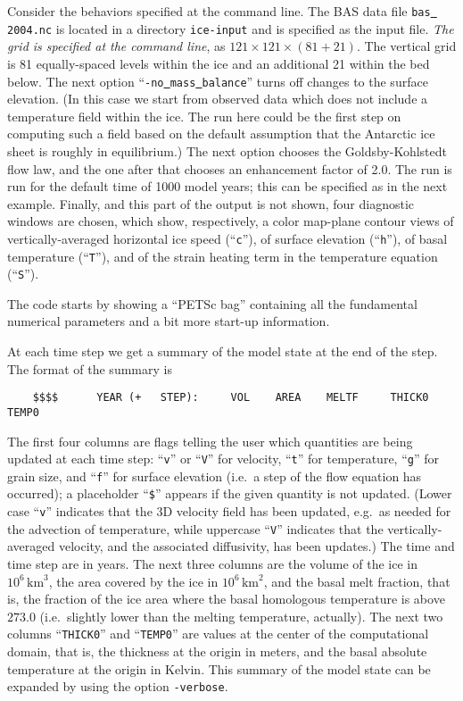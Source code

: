 \documentclass[final]{amsart}
\renewcommand{\t}[1]{\texttt{#1}}
\begin{document}
Consider the behaviors specified at the command line.  The BAS data file \t{bas\underline{ }2004.nc} is located in a directory \t{ice-input} and is specified as the input file.  \emph{The grid is specified at the command line}, as $121\times 121 \times (81+21)$.  The vertical grid is 81 equally-spaced levels within the ice and an additional 21 within the bed below.  The next option ``\t{-no\underline{ }mass\underline{ }balance}'' turns off changes to the surface elevation.  (In this case we start from observed data which does not include a temperature field within the ice.  The run here could be the first step on computing such a field based on the default assumption that the Antarctic ice sheet is roughly in equilibrium.)  The next option chooses the Goldsby-Kohlstedt \cite{GoldsbyKohlstedt} flow law, and the one after that chooses an enhancement factor of 2.0.  The run is run for the default time of 1000 model years; this can be specified as in the next example.  Finally, and this part of the output is not shown, four diagnostic windows are chosen, which show, respectively, a color map-plane contour views of vertically-averaged horizontal ice speed (``\t{c}''), of surface elevation (``\t{h}''), of basal temperature (``\t{T}''), and of the strain heating term in the temperature equation (``\t{S}'').

The code starts by showing a ``PETSc bag'' containing all the fundamental numerical parameters and a bit more start-up information.

At each time step we get a summary of the model state at the end of the step.  The format of the summary is
\scriptsize\begin{verbatim}
    $$$$      YEAR (+   STEP):     VOL    AREA    MELTF     THICK0     TEMP0
\end{verbatim}
\normalsize
The first four columns are flags telling the user which quantities are being updated at each time step: ``\texttt{v}'' or ``\texttt{V}'' for velocity, ``\texttt{t}'' for temperature, ``\texttt{g}'' for grain size, and ``\texttt{f}'' for surface elevation (i.e.~a step of the flow equation has occurred); a placeholder ``\verb|$|'' appears if the given quantity is not updated.  (Lower case ``\texttt{v}'' indicates that the 3D velocity field has been updated, e.g.~as needed for the advection of temperature, while uppercase ``\texttt{V}'' indicates that the vertically-averaged velocity, and the associated diffusivity, has been updates.)  The time and time step are in years.  The next three columns are the volume of the ice in $10^6 \,\text{km}^3$, the area covered by the ice in $10^6\,\text{km}^2$, and the basal melt fraction, that is, the fraction of the ice area where the basal homologous temperature is above $273.0$ (i.e.~slightly lower than the melting temperature, actually).  The next two columns ``\texttt{THICK0}'' and ``\texttt{TEMP0}'' are values at the center of the computational domain, that is, the thickness at the origin in meters, and the basal absolute temperature at the origin in Kelvin.  This summary of the model state can be expanded by using the option \verb|-verbose|.
 
\end{document}
